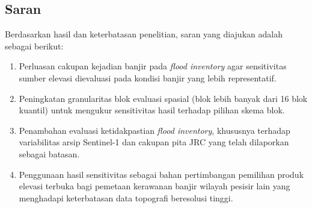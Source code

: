 \documentclass[12pt]{article}
\begin{document}
\subsection{Saran}

Berdasarkan hasil dan keterbatasan penelitian, saran yang diajukan adalah
sebagai berikut:

\begin{enumerate}
\item Perluasan cakupan kejadian banjir pada \textit{flood inventory} agar
sensitivitas sumber elevasi dievaluasi pada kondisi banjir yang lebih
representatif.
\item Peningkatan granularitas blok evaluasi spasial (blok lebih banyak dari
16 blok kuantil) untuk mengukur sensitivitas hasil terhadap pilihan skema
blok.
\item Penambahan evaluasi ketidakpastian \textit{flood inventory}, khususnya
terhadap variabilitas arsip Sentinel-1 dan cakupan pita JRC yang telah
dilaporkan sebagai batasan.
\item Penggunaan hasil sensitivitas sebagai bahan pertimbangan pemilihan
produk elevasi terbuka bagi pemetaan kerawanan banjir wilayah pesisir lain
yang menghadapi keterbatasan data topografi beresolusi tinggi.
\end{enumerate}

\FloatBarrier

\clearpage
\printbibliography[title={Daftar Pustaka}]
\end{document}
